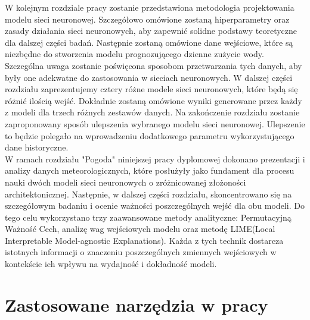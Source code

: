 \documentclass[a4paper,twoside,12pt]{book}
\begin{document}
W kolejnym rozdziale pracy zostanie przedstawiona metodologia projektowania modelu sieci neuronowej. Szczegółowo omówione zostaną hiperparametry oraz zasady działania sieci neuronowych, aby zapewnić solidne podstawy teoretyczne dla dalszej części badań. Następnie zostaną omówione dane wejściowe, które są niezbędne do stworzenia modelu prognozującego dzienne zużycie wody. Szczególna uwaga zostanie poświęcona sposobom przetwarzania tych danych, aby były one adekwatne do zastosowania w sieciach neuronowych. W dalszej części rozdziału zaprezentujemy cztery różne modele sieci neuronowych, które będą się różnić ilością wejść. Dokładnie zostaną omówione wyniki generowane przez każdy z modeli dla trzech różnych zestawów danych. Na zakończenie rozdziału zostanie zaproponowany sposób ulepszenia wybranego modelu sieci neuronowej. Ulepszenie to będzie polegało na wprowadzeniu dodatkowego parametru wykorzystującego dane historyczne.\\

W ramach rozdziału "Pogoda" niniejszej pracy dyplomowej dokonano prezentacji i analizy danych meteorologicznych, które posłużyły jako fundament dla procesu nauki dwóch modeli sieci neuronowych o zróżnicowanej złożoności architektonicznej. Następnie, w dalszej części rozdziału, skoncentrowano się na szczegółowym badaniu i ocenie ważności poszczególnych wejść dla obu modeli. Do tego celu wykorzystano trzy zaawansowane metody analityczne: Permutacyjną Ważność Cech, analizę wag wejściowych modelu oraz metodę LIME(Local Interpretable Model-agnostic Explanations). Każda z tych technik dostarcza istotnych informacji o znaczeniu poszczególnych zmiennych wejściowych w kontekście ich wpływu na wydajność i dokładność modeli.


\chapter{Zastosowane narzędzia w pracy}
\label{ch:wymagania-i-narzedzia}
\end{document}
